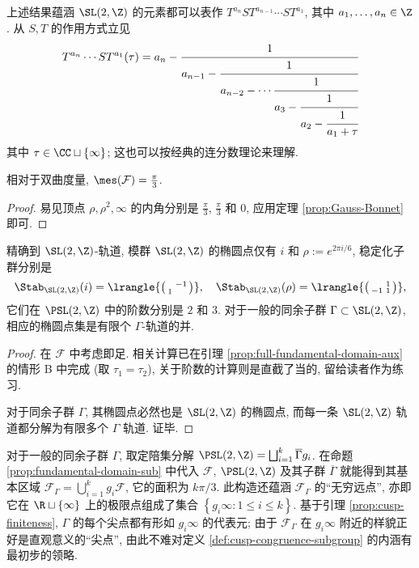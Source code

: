 上述结果蕴涵 $\SL(2,\Z)$ 的元素都可以表作 $T^{a_n} S T^{a_{n-1}} \cdots ST^{a_1}$, 其中 $a_1, \ldots, a_n \in \Z$. 从 $S,T$ 的作用方式立见
\[ T^{a_n} \cdots ST^{a_1}(\tau) =
	a_n - \cfrac{1}{ a_{n-1} -
		\cfrac{1}{a_{n-2} - \cdots
			\cfrac{1}{a_3 -
				\cfrac{1}{a_2 - \cfrac{1}{a_1
					+ \tau}
				}
			}
		}
	}
\]
其中 $\tau \in \CC \sqcup \{\infty\}$; 这也可以按经典的连分数理论来理解.

\begin{proposition}\label{prop:hyperbolic-volume}
	相对于双曲度量, $\mes(\mathcal{F}) = \frac{\pi}{3}$.
\end{proposition}
\begin{proof}
	易见顶点 $\rho, \rho^2, \infty$ 的内角分别是 $\frac{\pi}{3}$, $\frac{\pi}{3}$ 和 $0$, 应用定理 \ref{prop:Gauss-Bonnet} 即可.
\end{proof}

\begin{proposition}\label{prop:elliptic-pt-cyclic}
	精确到 $\SL(2,\Z)$-轨道, 模群 $\SL(2,\Z)$ 的椭圆点仅有 $i$ 和 $\rho := e^{2\pi i/6}$, 稳定化子群分别是
	\[ \Stab_{\SL(2,\Z)}(i) = \lrangle{ \twomatrix{}{-1}{1}{} }, \quad \Stab_{\SL(2,\Z)}(\rho) = \lrangle{ \twomatrix{}{1}{-1}{1} },  \]
	它们在 $\PSL(2,\Z)$ 中的阶数分别是 $2$ 和 $3$. 对于一般的同余子群 $\Gamma \subset \SL(2,\Z)$, 相应的椭圆点集是有限个 $\Gamma$-轨道的并.
\end{proposition}
\begin{proof}
	在 $\mathcal{F}$ 中考虑即足. 相关计算已在引理 \ref{prop:full-fundamental-domain-aux} 的情形 B 中完成 (取 $\tau_1 = \tau_2$), 关于阶数的计算则是直截了当的, 留给读者作为练习.
	
	对于同余子群 $\Gamma$, 其椭圆点必然也是 $\SL(2,\Z)$ 的椭圆点, 而每一条 $\SL(2,\Z)$ 轨道都分解为有限多个 $\Gamma$ 轨道. 证毕.
\end{proof}

对于一般的同余子群 $\Gamma$, 取定陪集分解 $\PSL(2,\Z) = \bigsqcup_{i=1}^k \overline{\Gamma} g_i$. 在命题 \ref{prop:fundamental-domain-sub} 中代入 $\mathcal{F}$, $\PSL(2,\Z)$ 及其子群 $\overline{\Gamma}$ 就能得到其基本区域 $\mathcal{F}_\Gamma = \bigcup_{i=1}^k g_i\mathcal{F}$, 它的面积为 $k\pi/3$. 此构造还蕴涵 $\mathcal{F}_\Gamma$ 的``无穷远点'', 亦即它在 $\R \sqcup \{\infty\}$ 上的极限点组成了集合 $\left\{ g_i \infty : 1 \leq i \leq k \right\}$. 基于引理 \ref{prop:cusp-finiteness}, $\Gamma$ 的每个尖点都有形如 $g_i \infty$ 的代表元; 由于 $\mathcal{F}_\Gamma$ 在 $g_i \infty$ 附近的样貌正好是直观意义的``尖点'', 由此不难对定义 \ref{def:cusp-congruence-subgroup} 的内涵有最初步的领略.

